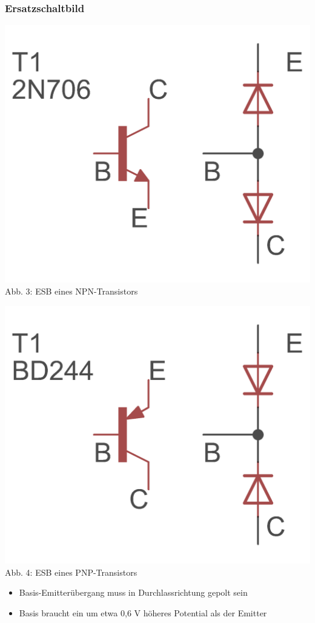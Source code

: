 \begin{frame}
\frametitle{Ersatzschaltbild}

\begin{minipage}{0.4\textwidth}
	\includegraphics[scale=1.4]{a06/NPN_esb.png}\\
	Abb. 3: ESB eines NPN-Transistors
\end{minipage}
\hspace{0.5cm}
\begin{minipage}{0.4\textwidth}
	\includegraphics[scale=1.4]{e13/PNP_esb.png}\\
	Abb. 4: ESB eines PNP-Transistors
\end{minipage}
\vspace{2mm}
\begin{itemize}
	\item	Basis-Emitterübergang muss in Durchlassrichtung gepolt sein
	\item	Basis braucht ein um etwa 0,6 V höheres Potential als der Emitter
\end{itemize}

\end{frame}


